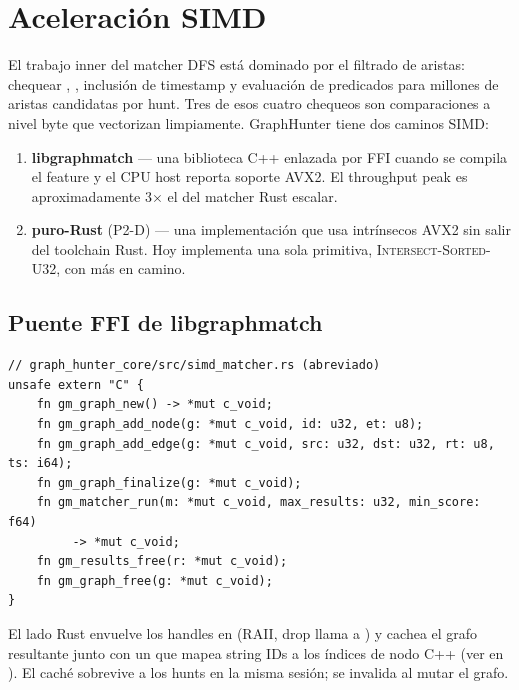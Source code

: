 \chapter{Aceleración SIMD}
\label{ch:simd}

El trabajo inner del matcher DFS está dominado por el filtrado
de aristas: chequear ,
, inclusión de timestamp y
evaluación de predicados para millones de aristas candidatas por
hunt. Tres de esos cuatro chequeos son comparaciones a nivel byte
que vectorizan limpiamente. GraphHunter tiene dos caminos SIMD:

\begin{enumerate}
    \item \textbf{libgraphmatch} --- una biblioteca C++ enlazada
        por FFI cuando se compila el feature  y el CPU
        host reporta soporte AVX2. El throughput peak es
        aproximadamente 3$\times$ el del matcher Rust escalar.
    \item \textbf{ puro-Rust} (P2-D) --- una
        implementación  que usa
        intrínsecos AVX2 sin salir del toolchain Rust. Hoy
        implementa una sola primitiva,
        \textsc{Intersect-Sorted-U32}, con más en camino.
\end{enumerate}

\section{Puente FFI de libgraphmatch}

\begin{lstlisting}[style=rust]
// graph_hunter_core/src/simd_matcher.rs (abreviado)
unsafe extern "C" {
    fn gm_graph_new() -> *mut c_void;
    fn gm_graph_add_node(g: *mut c_void, id: u32, et: u8);
    fn gm_graph_add_edge(g: *mut c_void, src: u32, dst: u32, rt: u8, ts: i64);
    fn gm_graph_finalize(g: *mut c_void);
    fn gm_matcher_run(m: *mut c_void, max_results: u32, min_score: f64)
         -> *mut c_void;
    fn gm_results_free(r: *mut c_void);
    fn gm_graph_free(g: *mut c_void);
}
\end{lstlisting}

El lado Rust envuelve los handles  en
 (RAII, drop llama a ) y
cachea el grafo resultante junto con un
 que mapea string IDs a los índices
de nodo C++ (ver  en
). El caché sobrevive a los hunts en
la misma sesión; se invalida al mutar el grafo.

